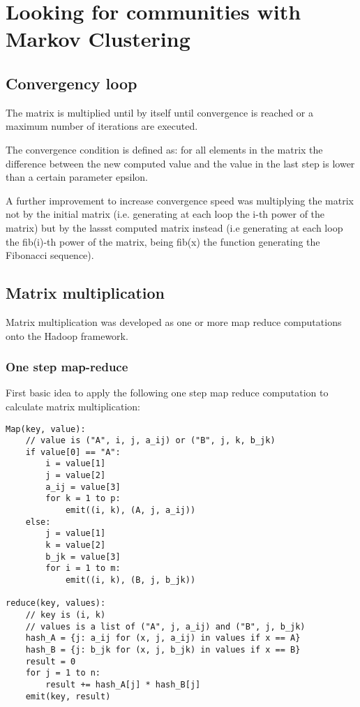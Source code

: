 \section{Looking for communities with Markov Clustering}
\label{mcl}


\subsection{Convergency loop}

The matrix is multiplied until by itself until convergence is reached
or a maximum number of iterations are executed.

The convergence condition is defined as: for all elements in the matrix
the difference between the new computed value and the value in the last step
is lower than a certain parameter epsilon.

A further improvement to increase convergence speed was multiplying the
matrix not by the initial matrix (i.e. generating at each loop the i-th
power of the matrix) but by the lassst computed matrix instead (i.e generating
at each loop the fib(i)-th power of the matrix, being fib(x) the function generating
the Fibonacci sequence).

\subsection{Matrix multiplication}

Matrix multiplication was developed as one or more map reduce computations onto the
Hadoop framework.

\subsubsection{One step map-reduce}

First basic idea to apply the following one step map reduce computation to calculate
matrix multiplication:

\begin{verbatim}
Map(key, value):
    // value is ("A", i, j, a_ij) or ("B", j, k, b_jk)
    if value[0] == "A":
        i = value[1]
        j = value[2]
        a_ij = value[3]
        for k = 1 to p:
            emit((i, k), (A, j, a_ij))
    else:
        j = value[1]
        k = value[2]
        b_jk = value[3]
        for i = 1 to m:
            emit((i, k), (B, j, b_jk))

reduce(key, values):
    // key is (i, k)
    // values is a list of ("A", j, a_ij) and ("B", j, b_jk)
    hash_A = {j: a_ij for (x, j, a_ij) in values if x == A}
    hash_B = {j: b_jk for (x, j, b_jk) in values if x == B}
    result = 0
    for j = 1 to n:
        result += hash_A[j] * hash_B[j]
    emit(key, result)
\end{verbatim}

